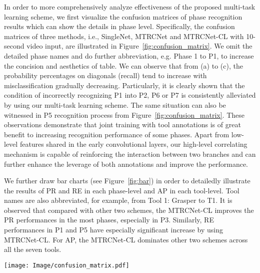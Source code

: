 \documentclass{elsarticle}
\begin{document}
In order to more comprehensively analyze effectiveness of the proposed multi-task learning scheme, we first visualize the confusion matrices of phase recognition results which can show the details in phase level.
Specifically, the confusion matrices of three methods, i.e., SingleNet, MTRCNet and MTRCNet-CL with 10-second video input, are illustrated in Figure~\ref{fig:confusion_matrix}.
We omit the detailed phase names and do further abbreviation, e.g. Phase 1 to P1, to increase the concision and aesthetics of table.
We can observe that from (a) to (c), the probability percentages on diagonals (recall) tend to increase with misclassification gradually decreasing.
Particularly, it is clearly shown that the condition of incorrectly recognizing P1 into P2, P6 or P7 is consistently alleviated by using our  multi-task learning scheme. 
The same situation can also be witnessed in P5 recognition process from Figure~\ref{fig:confusion_matrix}.
These observations demonstrate that joint training with tool annotations is of great benefit to increasing recognition performance of some phases.
Apart from low-level features shared in the early convolutional layers, our high-level correlating mechanism is capable of reinforcing the interaction between two branches and can further enhance the leverage of both annotations and improve the performance.

We further draw bar charts (see Figure~\ref{fig:bar}) in order to detailedly illustrate the results of PR and RE in each phase-level and AP in each tool-level.
Tool names are also abbreviated, for example, from Tool 1: Grasper to T1.
It is observed that compared with other two schemes, the MTRCNet-CL improves the PR performances in the most phases, especially in P3. 
Similarly, RE performances in P1 and P5 have especially significant increase by using MTRCNet-CL.
For AP, the MTRCNet-CL dominates other two schemes across all the seven tools.




\begin{figure*}[t]
	\centering
	\texttt{[image: Image/confusion\_matrix.pdf]}
\caption{Confusion matrices visualized by the color brightness of three methods
		(a) SingleNet, (b) MTRCNet, and (c) MTRCNet-CL.
		In each confusion matrix, the X and Y-axis indicate predicted phase label and ground truth, respectively; 
		element (x, y) represents the empirical probability of predicting class x given that the ground truth is class y;
		the probability number on diagonal is the recall for each surgical phase.}
	\label{fig:confusion_matrix}
\end{figure*}
\end{document}
